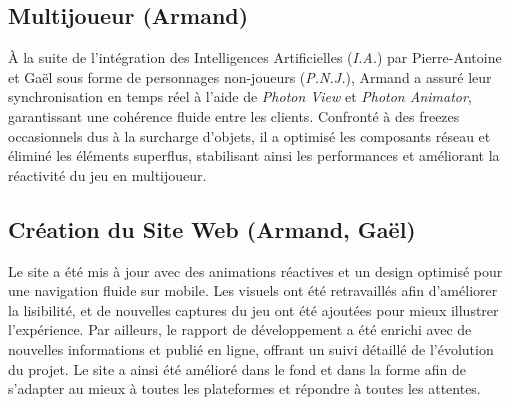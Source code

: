 \documentclass{report}
\begin{document}
\subsection*{Multijoueur (Armand)}
À la suite de l’intégration des Intelligences Artificielles (\textit{I.A.}) par Pierre-Antoine et Gaël sous forme de personnages non-joueurs (\textit{P.N.J.}), Armand a assuré leur synchronisation en temps réel à l’aide de \textit{Photon View} et \textit{Photon Animator}, garantissant une cohérence fluide entre les clients. Confronté à des freezes occasionnels dus à la surcharge d’objets, il a optimisé les composants réseau et éliminé les éléments superflus, stabilisant ainsi les performances et améliorant la réactivité du jeu en multijoueur.


\subsection*{Création du Site Web (Armand, Gaël)}
Le site a été mis à jour avec des animations réactives et un design optimisé pour une navigation fluide sur mobile. Les visuels ont été retravaillés afin d’améliorer la lisibilité, et de nouvelles captures du jeu ont été ajoutées pour mieux illustrer l’expérience. Par ailleurs, le rapport de développement a été enrichi avec de nouvelles informations et publié en ligne, offrant un suivi détaillé de l’évolution du projet. Le site a ainsi été amélioré dans le fond et dans la forme afin de s'adapter au mieux à toutes les plateformes et répondre à toutes les attentes.
\end{document}
